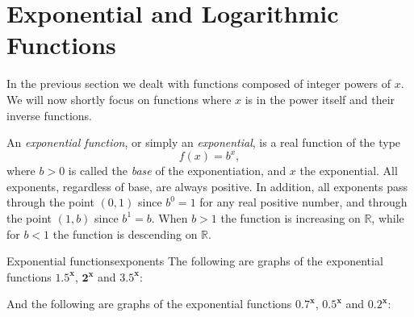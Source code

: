 \section{Exponential and Logarithmic Functions}
In the previous section we dealt with functions composed of integer powers of $x$. We will now shortly focus on functions where $x$ is in the power itself and their inverse functions.

An \emph{exponential function}, or simply an \emph{exponential}, is a real function of the type
\begin{equation}
	f(x) = b^{x},
	\label{eq:exponent}
\end{equation}
where $b>0$ is called the \emph{base} of the exponentiation, and $x$ the exponential. All exponents, regardless of base, are always positive. In addition, all exponents pass through the point $(0,1)$ since $b^{0}=1$ for any real positive number, and through the point $(1,b)$ since $b^{1}=b$. When $b>1$ the function is increasing on $\mathbb{R}$, while for $b<1$ the function is descending on $\mathbb{R}$.

\begin{example}{Exponential functions}{exponents}
	The following are graphs of the exponential functions \textcolor{xred}{$\bm{1.5^{x}}$}, \textcolor{xblue}{$\bm{2^{x}}$} and \textcolor{xgreen}{$\bm{3.5^{x}}$}:
	\begin{figure}[H]
		\centering
	\end{figure}

	And the following are graphs of the exponential functions \textcolor{xpurple}{$\bm{0.7^{x}}$}, \textcolor{xorange}{$\bm{0.5^{x}}$} and $\bm{0.2^{x}}$:
	\begin{figure}[H]
		\centering
	\end{figure}
\end{example}

